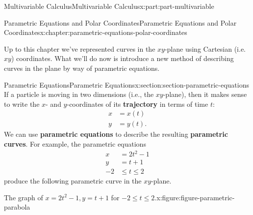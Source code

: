 \documentclass[twoside,10pt,]{book}
\newcommand{\terminology}[1]{\textbf{#1}}
\numberwithin{equation}{part}
\newcommand{\amp}{&}
\begin{document}
\begin{partptx}{Multivariable Calculus}{}{Multivariable Calculus}{}{}{x:part:part-multivariable}
%
\typeout{************************************************}
\typeout{************************************************}
%
\begin{chapterptx}{Parametric Equations and Polar Coordinates}{}{Parametric Equations and Polar Coordinates}{}{}{x:chapter:parametric-equations-polar-coordinates}
\begin{introduction}{}%
Up to this chapter we've represented curves in the \(xy\)-plane using Cartesian (i.e. \(xy\)) coordinates. What we'll do now is introduce a new method of describing curves in the plane by way of parametric equations.%
\end{introduction}%
%
%
\typeout{************************************************}
\typeout{************************************************}
%
\begin{sectionptx}{Parametric Equations}{}{Parametric Equations}{}{}{x:section:section-parametric-equations}
If a particle is moving in two dimensions (i.e., the \(xy\)-plane), then it makes sense to write the \(x\)- and \(y\)-coordinates of its \terminology{trajectory} in terms of time \(t\):%
\begin{align*}
x \amp = x(t) \\
y \amp = y(t) \text{.}
\end{align*}
We can use \terminology{parametric equations} to describe the resulting \terminology{parametric curves}. For example, the parametric equations%
%
\begin{align*}
x \amp = 2t^{2}-1 \\
y \amp = t+1 \\
-2 \amp \leq t\leq 2 
\end{align*}
produce the following parametric curve in the \(xy\)-plane.%
\begin{figureptx}{The graph of \(x = 2t^2-1, y=t+1\) for \(-2\leq t\leq 2\).}{x:figure:figure-parametric-parabola}{}%
\begin{image}{0}{1}{0}%
\end{image}
\end{figureptx}
\end{sectionptx}
\end{chapterptx}
\end{partptx}
\end{document}
